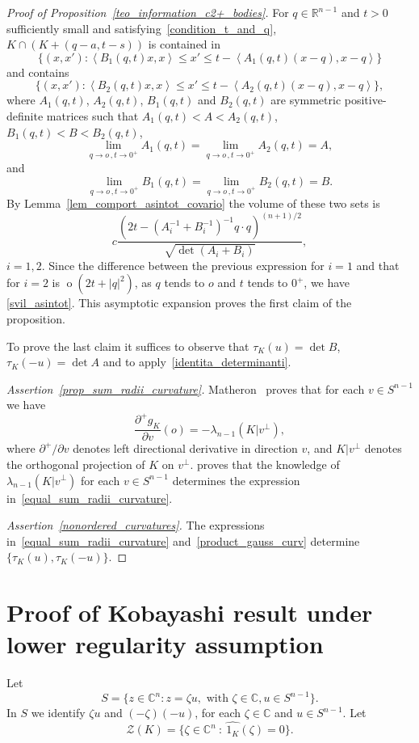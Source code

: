 \documentclass[a4paper]{amsart}
\theoremstyle{definition}
\numberwithin{equation}{section}
\begin{document}
\begin{proof}[Proof of Proposition~\ref{teo_information_c2+_bodies}]
For $q\in{\mathbb{R}}^{n-1}$ and $t>0$ sufficiently small and satisfying~\eqref{condition_t_and_q}, $K\cap (K+(q-a,t-s))$ is contained in
\[
 \{(x,x'): \left<B_1(q,t)x, x\right>\le x'\le t-\left<A_1(q,t)(x-q), x-q\right> \}
\]
and contains
\[
 \{(x,x'): \left<B_2(q,t)x, x\right>\le x'\le t-\left<A_2(q,t)(x-q), x-q\right> \},
\]
where $A_1(q,t)$, $A_2(q,t)$, $B_1(q,t)$ and $B_2(q,t)$ are symmetric positive-definite matrices such that
$A_1(q,t)<A <A_2(q,t)$, $B_1(q,t)<B <B_2(q,t)$,
\[
 \lim_{q\rightarrow o\,,t\rightarrow 0^+} A_1(q,t)=\lim_{q\rightarrow o\,,t\rightarrow 0^+} A_2(q,t)=A,
\]
and
\[
 \lim_{q\rightarrow o\,,t\rightarrow 0^+} B_1(q,t)=\lim_{q\rightarrow o\,,t\rightarrow 0^+} B_2(q,t)=B.
\]
By Lemma~\ref{lem_comport_asintot_covario} the volume  of these two sets is
\[
c\frac
{ \left( 2t-\left(A_i^{-1}+B_i^{-1}\right)^{-1}q\cdot q\right)^{(n+1)/2}}
{\sqrt{\det(A_i+B_i)}},
\]
$i=1,2$. Since the difference between the previous expression for $i=1$ and that for $i=2$ is ${{\operatorname{o}}}(2t+|q|^2)$, as $q$ tends to $o$ and $t$ tends to $0^+$, we have \eqref{svil_asintot}. This asymptotic expansion proves the first claim of the proposition.

To prove the last claim it suffices to observe that ${\tau}_K(u)=\det B$, ${\tau}_K(-u)=\det A$ and to apply~\eqref{identita_determinanti}.

\emph{Assertion~\eqref{prop_sum_radii_curvature}.} Matheron~\cite[p.~86]{Matheron-1975}  proves that for each $v\in{S^{n-1}}$ we have
\[
\frac{\partial^+ g_K}{\partial v}(o)=-{{\lambda}}_{n-1}\left(K|v^\perp\right),
\]
where $\partial^+ /\partial v$ denotes left directional derivative  in direction $v$, and $K|v^\perp$ denotes  the orthogonal projection of $K$ on $v^\perp$.
\cite[Theorem 3.3.2]{Gar95ed2} proves that the knowledge of ${{\lambda}}_{n-1}\left(K|v^\perp\right)$ for each $v\in{S^{n-1}}$ determines  the expression in~\eqref{equal_sum_radii_curvature}.

\emph{Assertion~\eqref{nonordered_curvatures}.} The  expressions in~\eqref{equal_sum_radii_curvature} and~\eqref{product_gauss_curv} determine $\{{\tau}_K(u), {\tau}_K(-u)\}$.
\end{proof}

\section{Proof of Kobayashi result under lower regularity assumption} \label{sec_kobayashi_cm}
Let 
 \[
S=\{z\in{\mathbb{C}}^n : z={{\zeta}} u, \text{ with }{{\zeta}}\in{\mathbb{C}}, u\in {S^{n-1}}\}.
 \]
In $S$ we identify ${{\zeta}} u$ and $(-{{\zeta}})(-u)$, for each ${{\zeta}}\in{\mathbb{C}}$ and $u\in{S^{n-1}}$. 
Let
\[
{{\mathcal Z}}(K)=\{\zeta\in{\mathbb{C}}^n\ :\ {\widehat{{{1_K}}}}(\zeta)=0\}.
\]
\end{document}
